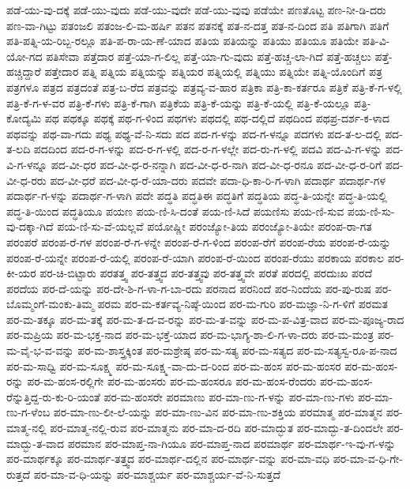{ಪಡೆ-ಯು-ವು-ದಕ್ಕೆ
ಪಡೆ-ಯು-ವುದು
ಪಡೆ-ಯು-ವುದೇ
ಪಡೆ-ಯು-ವುವು
ಪಡೆಯೇ
ಪಣತೊಟ್ಟ
ಪಣ-ನೀ-ಡಿ-ದರು
ಪಣ-ವಾ-ಗಿಟ್ಟು
ಪತಂಜಲಿ
ಪತಂಜ-ಲಿ-ಮ-ಹರ್ಷಿ
ಪತನ
ಪತನಕ್ಕೆ
ಪತ-ನ-ದತ್ತ
ಪತ-ನ-ದಿಂದ
ಪತಿ
ಪತಿಗಾಗಿ
ಪತಿಗೆ
ಪತಿ-ಪತ್ನಿ-ಯ-ರಿಬ್ಬ-ರಲ್ಲೂ
ಪತಿ-ಪ-ರಾ-ಯ-ಣೆ-ಯಾದ
ಪತಿಯ
ಪತಿಯನ್ನು
ಪತಿಯು
ಪತಿಯೂ
ಪತಿಯೇ
ಪತಿ-ವಿ-ಯೋ-ಗದ
ಪತಿಸೇವಾ
ಪತ್ತೆದಾರ
ಪತ್ತೆ-ಯಾ-ಗ-ಲಿಲ್ಲ
ಪತ್ತೆ-ಯಾ-ಗು-ವುದು
ಪತ್ತೆ-ಹಚ್ಚ-ಲಾ-ಗಿದೆ
ಪತ್ತೆ-ಹಚ್ಚಲು
ಪತ್ತೆ-ಹಚ್ಚಿದ್ದಾರೆ
ಪತ್ತೇದಾರ
ಪತ್ನಿ
ಪತ್ನಿಯ
ಪತ್ನಿಯನ್ನು
ಪತ್ನಿಯರ
ಪತ್ನಿಯಲ್ಲಿ
ಪತ್ನಿಯು
ಪತ್ನಿಯೇ
ಪತ್ನಿ-ಯೊಂದಿಗೆ
ಪತ್ರ
ಪತ್ರಗಳೂ
ಪತ್ರದ
ಪತ್ರದಂತೆ
ಪತ್ರ-ಬ-ರೆದ
ಪತ್ರವನ್ನು
ಪತ್ರವ್ಯ-ವ-ಹಾರ
ಪತ್ರಿಕಾ
ಪತ್ರಿ-ಕಾ-ಕರ್ತರೂ
ಪತ್ರಿಕೆ
ಪತ್ರಿ-ಕೆ-ಗ-ಳಲ್ಲಿ
ಪತ್ರಿ-ಕೆ-ಗ-ಳ-ವರ
ಪತ್ರಿ-ಕೆ-ಗಳು
ಪತ್ರಿ-ಕೆ-ಗಾಗಿ
ಪತ್ರಿಕೆಯ
ಪತ್ರಿ-ಕೆ-ಯನ್ನು
ಪತ್ರಿ-ಕೆ-ಯಲ್ಲಿ
ಪತ್ರಿ-ಕೆ-ಯಲ್ಲೂ
ಪತ್ರಿ-ಕೋದ್ಯಮಿ
ಪಥ
ಪಥಕ್ಕೂ
ಪಥಕ್ಕೆ
ಪಥ-ಗ-ಳಿಂದ
ಪಥಗಳು
ಪಥದಲ್ಲಿ
ಪಥ-ದಲ್ಲಿದೆ
ಪಥದಿಂದ
ಪಥಪ್ರ-ದರ್ಶ-ಕ-ಳಾದ
ಪಥವನ್ನು
ಪಥ-ವಾ-ಗದು
ಪಥ್ಯ
ಪಥ್ಯ-ವೆ-ನಿ-ಸದು
ಪದ
ಪದ-ಗ-ಳನ್ನು
ಪದ-ಗ-ಳನ್ನೂ
ಪದಗಳು
ಪದ-ತ-ಲ-ದಲ್ಲಿ
ಪದ-ತ-ಲದಿ
ಪದದಿಂದ
ಪದ-ರ-ಗ-ಳನ್ನು
ಪದ-ರ-ಗ-ಳಲ್ಲಿ
ಪದ-ರ-ಗ-ಳಲ್ಲೇ
ಪದ-ರು-ಗ-ಳಲ್ಲಿ
ಪದವಿ
ಪದ-ವಿ-ಗ-ಳನ್ನು
ಪದ-ವಿ-ಗ-ಳನ್ನೂ
ಪದ-ವೀ-ಧರ
ಪದ-ವೀ-ಧ-ರ-ನನ್ನಾಗಿ
ಪದ-ವೀ-ಧ-ರ-ನಾಗಿ
ಪದ-ವೀ-ಧ-ರನೂ
ಪದ-ವೀ-ಧ-ರ-ರಿಗೆ
ಪದ-ವೀ-ಧ-ರರು
ಪದ-ವೀ-ಧರೆ
ಪದ-ವೀ-ಧ-ರೆ-ಯಾ-ದರು
ಪದವೇ
ಪದಾ-ಧಿ-ಕಾ-ರಿ-ಗ-ಳಾಗಿ
ಪದಾರ್ಥ
ಪದಾರ್ಥ-ಗಳ
ಪದಾರ್ಥ-ಗ-ಳನ್ನು
ಪದಾರ್ಥ-ಗ-ಳಾಗಿ
ಪದೇ
ಪದ್ಧತಿ
ಪದ್ಧತಿಈ
ಪದ್ಧತಿಗೆ
ಪದ್ಧತಿಯ
ಪದ್ಧ-ತಿ-ಯನ್ನೇ
ಪದ್ಧ-ತಿ-ಯಲ್ಲಿ
ಪದ್ಧ-ತಿ-ಯಿಂದ
ಪದ್ಧತಿಯೂ
ಪಯಣ
ಪಯ-ಣಿ-ಸಿ-ದಂತೆ
ಪಯ-ಣಿ-ಸಿದೆ
ಪಯಣಿಸು
ಪಯ-ಣಿ-ಸುವ
ಪಯ-ಣಿ-ಸು-ವು-ದಕ್ಕಾ-ಗಿದೆ
ಪಯ-ಣಿ-ಸು-ವೆ-ಯಲ್ಲವೆ
ಪಯೋಷ್ಣೀ
ಪರಂಜ್ಯೋ-ತಿಯ
ಪರಂಜ್ಯೋ-ತಿಯೇ
ಪರಂಪ-ರಾ-ಗತ
ಪರಂಪರೆ
ಪರಂಪ-ರೆ-ಗಳ
ಪರಂಪ-ರೆ-ಗ-ಳನ್ನೇ
ಪರಂಪ-ರೆ-ಗ-ಳಿಂದ
ಪರಂಪ-ರೆಗೆ
ಪರಂಪ-ರೆಯ
ಪರಂಪ-ರೆ-ಯನ್ನು
ಪರಂಪ-ರೆ-ಯನ್ನೇ
ಪರಂಪ-ರೆ-ಯಲ್ಲಿ
ಪರಂಪ-ರೆ-ಯಾಗಿ
ಪರಂಪ-ರೆ-ಯಿಂದ
ಪರಂಪ-ರೆಯು
ಪರಕಾಯ
ಪರಕಾಲ
ಪರ-ಕೀ-ಯರ
ಪರ-ಚಿ-ಬಿಟ್ಟಾರು
ಪರತತ್ತ್ವ
ಪರ-ತತ್ತ್ವದ
ಪರ-ತತ್ತ್ವವು
ಪರ-ತತ್ತ್ವವೇ
ಪರತೆ
ಪರದಲ್ಲಿ
ಪರದುಃಖ
ಪರದೆ
ಪರದೆಯ
ಪರ-ದೆ-ಯನ್ನು
ಪರ-ದೇ-ಶಿ-ಗ-ಳಾ-ಗ-ಬಾ-ರದು
ಪರನಾದ
ಪರನಿಂದೆ
ಪರ-ನಿಂದೆಯ
ಪರ-ಪು-ರುಷ
ಪರ-ಬೊಮ್ಮಂಗೆ-ಮಂಕು-ತಿಮ್ಮ
ಪರಮ
ಪರ-ಮ-ಕರ್ತವ್ಯ-ನಿಷ್ಠೆ-ಯಿಂದ
ಪರ-ಮ-ಗುರಿ
ಪರ-ಮಜ್ಞಾ-ನಿ-ಗ-ಳಿಗೆ
ಪರಮತ
ಪರ-ಮ-ತಕ್ಕೂ
ಪರ-ಮ-ತಕ್ಕೆ
ಪರ-ಮ-ತ-ದ-ವ-ರನ್ನು
ಪರ-ಮ-ತ-ವನ್ನು
ಪರ-ಮ-ಪ-ವಿತ್ರ-ವಾದ
ಪರ-ಮ-ಪೂಜ್ಯ-ರಾದ
ಪರ-ಮಪ್ರಿಯ
ಪರ-ಮ-ಭಕ್ತ-ನಾದ
ಪರ-ಮ-ಭಕ್ತೆ-ಯಾದ
ಪರ-ಮ-ಭಾಗ್ಯ-ಶಾ-ಲಿ-ಗ-ಳಾ-ದರು
ಪರ-ಮ-ಮಂತ್ರ
ಪರ-ಮ-ವೈ-ಭ-ವ-ವನ್ನು
ಪರ-ಮ-ಶಾಸ್ತ್ರಕ್ಕಿಂತ
ಪರ-ಮಶ್ರೇಷ್ಠ
ಪರ-ಮ-ಸತ್ಯ
ಪರ-ಮ-ಸತ್ಯದ
ಪರ-ಮ-ಸತ್ಯಸ್ವ-ರೂ-ಪ-ನಾದ
ಪರ-ಮ-ಸಾಧ್ವಿ
ಪರ-ಮ-ಸೂಕ್ಷ್ಮ
ಪರ-ಮ-ಸೂಕ್ಷ್ಮ-ವಾ-ದು-ದ-ರಿಂದ
ಪರ-ಮ-ಹಂಸ
ಪರ-ಮ-ಹಂಸರ
ಪರ-ಮ-ಹಂಸ-ರನ್ನು
ಪರ-ಮ-ಹಂಸ-ರಲ್ಲಿಗೇ
ಪರ-ಮ-ಹಂಸರು
ಪರ-ಮ-ಹಂಸರೂ
ಪರ-ಮ-ಹಂಸ-ರೆಂದರು
ಪರ-ಮ-ಹಂಸ-ರೆನ್ನುತ್ತಿದ್ದ-ರು-ಕು-ರಿ-ಯಂತೆ
ಪರ-ಮ-ಹಂಸರೇ
ಪರಮಾಣು
ಪರ-ಮಾ-ಣು-ಗ-ಳನ್ನು
ಪರ-ಮಾ-ಣು-ಗಳು
ಪರ-ಮಾ-ಣು-ಗ-ಳೆಂಬ
ಪರ-ಮಾ-ಣು-ಲೀ-ಲೆ-ಯನ್ನು
ಪರ-ಮಾ-ಣು-ವಿನ
ಪರ-ಮಾ-ಣು-ಶಕ್ತಿಯ
ಪರಮಾತ್ಮ
ಪರ-ಮಾತ್ಮನ
ಪರ-ಮಾತ್ಮ-ನಲ್ಲಿ
ಪರ-ಮಾತ್ಮ-ನಲ್ಲಿ-ರುವ
ಪರ-ಮಾತ್ಮನು
ಪರ-ಮಾ-ದ-ರದಿ
ಪರ-ಮಾದ್ಭುತ
ಪರ-ಮಾದ್ಭು-ತ-ದಿಂದಲೇ
ಪರ-ಮಾದ್ಭು-ತ-ವಾದ
ಪರಮಾನ
ಪರ-ಮಾಪ್ತ-ನಾ-ಗಿಯೂ
ಪರ-ಮಾಪ್ತ-ನಾದ
ಪರಮಾರ್ಥ
ಪರ-ಮಾರ್ಥ-ಇ-ವು-ಗ-ಳನ್ನು
ಪರ-ಮಾರ್ಥಕ್ಕೂ
ಪರ-ಮಾರ್ಥ-ತತ್ತ್ವದ
ಪರ-ಮಾರ್ಥ-ದಲ್ಲಿನ
ಪರ-ಮಾರ್ಥ-ವನ್ನು
ಪರ-ಮಾ-ವಧಿ
ಪರ-ಮಾ-ವ-ಧಿ-ಗೇ-ರುತ್ತದೆ
ಪರ-ಮಾ-ವ-ಧಿ-ಯನ್ನು
ಪರ-ಮಾಶ್ಚರ್ಯ
ಪರ-ಮಾಶ್ಚರ್ಯ-ವೆ-ನಿ-ಸುತ್ತದೆ
}
